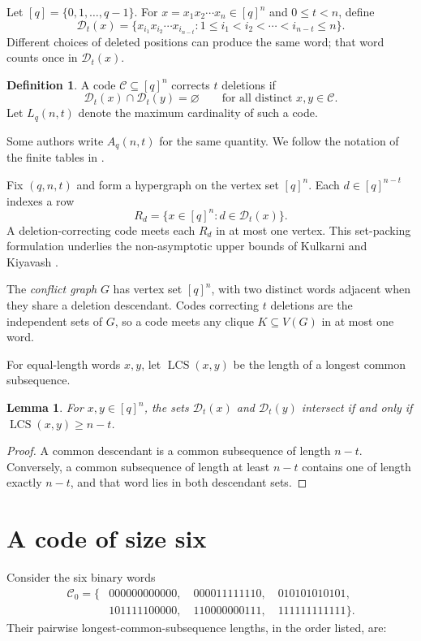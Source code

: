 \documentclass[11pt]{article}
\newtheorem{lemma}[theorem]{Lemma}
\theoremstyle{definition}
\newtheorem{definition}[theorem]{Definition}
\newcommand{\D}{\mathcal{D}}
\newcommand{\C}{\mathcal{C}}
\newcommand{\lcs}{\operatorname{LCS}}
\begin{document}
Let $[q]=\{0,1,\dots,q-1\}$.  For $x=x_1x_2\cdots x_n\in[q]^n$ and
$0\leq t<n$, define
\[
  \D_t(x)
  =\bigl\{x_{i_1}x_{i_2}\cdots x_{i_{n-t}}:
      1\leq i_1<i_2<\cdots<i_{n-t}\leq n\bigr\}.
\]
Different choices of deleted positions can produce the same word; that word
counts once in $\D_t(x)$.

\begin{definition}
A code $\C\subseteq[q]^n$ corrects $t$ deletions if
\[
  \D_t(x)\cap\D_t(y)=\varnothing
  \qquad\text{for all distinct }x,y\in\C.
\]
Let $L_q(n,t)$ denote the maximum cardinality of such a code.
\end{definition}

Some authors write $A_q(n,t)$ for the same quantity.  We follow the notation
of the finite tables in \cite{landjev2007multiple,kolev2016optimal}.

Fix $(q,n,t)$ and form a hypergraph on the vertex set $[q]^n$.  Each
$d\in[q]^{n-t}$ indexes a row
\[
  R_d=\{x\in[q]^n:d\in\D_t(x)\}.
\]
A deletion-correcting code meets each $R_d$ in at most one vertex.  This
set-packing formulation underlies the non-asymptotic upper bounds of Kulkarni
and Kiyavash \cite{kulkarni2013nonasymptotic}.

The \emph{conflict graph} $G$ has vertex set $[q]^n$, with two distinct words
adjacent when they share a deletion descendant.  Codes correcting $t$
deletions are the independent sets of $G$, so a code meets any clique
$K\subseteq V(G)$ in at most one word.

For equal-length words $x,y$, let $\lcs(x,y)$ be the length of a longest
common subsequence.

\begin{lemma}\label{lem:lcs}
For $x,y\in[q]^n$, the sets $\D_t(x)$ and $\D_t(y)$ intersect if and only if
$\lcs(x,y)\geq n-t$.
\end{lemma}

\begin{proof}
A common descendant is a common subsequence of length $n-t$.  Conversely, a
common subsequence of length at least $n-t$ contains one of length exactly
$n-t$, and that word lies in both descendant sets.
\end{proof}

\section{A code of size six}\label{sec:lower}

Consider the six binary words
\begin{equation}\label{eq:codebook}
\begin{split}
\C_0=\{&000000000000,\quad 000011111110,\quad 010101010101,\\
       &101111100000,\quad 110000000111,\quad 111111111111\}.
\end{split}
\end{equation}
Their pairwise longest-common-subsequence lengths, in the order listed, are:
\end{document}
